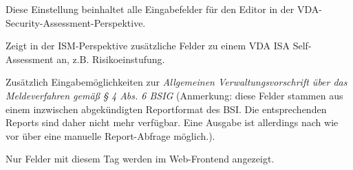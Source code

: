\documentclass[a4paper,10pt]{book}
\newcommand*{\descrfont}[1]{\textit{#1 -}}
\begin{document}
\begin{description}[font=\normalfont\descrfont]
	\item[VDA-ISA] Diese Einstellung beinhaltet alle Eingabefelder für den Editor in der VDA-Security-Assessment-Perspektive.
	\item[VDA\_ISA\_Audit] Zeigt in der ISM-Perspektive zusätzliche Felder zu einem VDA ISA Self-Assessment an, z.B. Risikoeinstufung.
	\item[VV-BSIG] Zusätzlich Eingabemöglichkeiten zur \emph{Allgemeinen Verwaltungsvorschrift über das Meldeverfahren gemäß § 4 Abs. 6 BSIG} (Anmerkung: diese Felder stammen aus einem inzwischen abgekündigten Reportformat des BSI. Die entsprechenden Reports sind daher nicht mehr verfügbar. Eine Ausgabe ist allerdings nach wie vor über eine manuelle Report-Abfrage möglich.).
	\item[Web] Nur Felder mit diesem Tag werden im Web-Frontend angezeigt.
\end{description}
\end{document}
